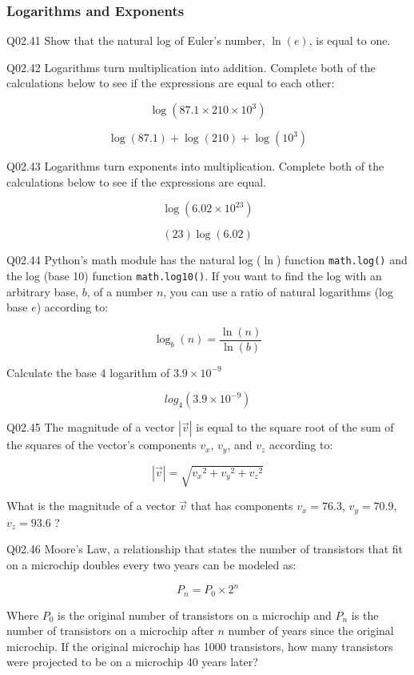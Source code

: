 \documentclass{book}
\newenvironment{problems}{}{}  %
\begin{document}
    




    
        \begin{problems}
        \subsubsection{Logarithms and Exponents}\label{logarithms-and-exponents}

Q02.41 Show that the natural log of Euler's number, \(\ln(e)\), is equal
to one.

Q02.42 Logarithms turn multiplication into addition. Complete both of
the calculations below to see if the expressions are equal to each
other:

\[ \log(87.1 \times 210 \times 10^{3}) \]

\[ \log(87.1) + \log(210) + \log(10^{3}) \]

Q02.43 Logarithms turn exponents into multiplication. Complete both of
the calculations below to see if the expressions are equal.

\[ \log(6.02 \times 10^{23}) \]

\[ (23)\log(6.02) \]

Q02.44 Python's math module has the natural log (\(\ln\)) function
\lstinline!math.log()! and the log (base 10) function
\lstinline!math.log10()!. If you want to find the log with an arbitrary
base, \(b\), of a number \(n\), you can use a ratio of natural
logarithms (log base \(e\)) according to:

\[ \log_b(n) = \frac{\ln(n)}{\ln(b)} \]

Calculate the base 4 logarithm of \(3.9 \times 10^{-9}\)

\[ log_{4}(3.9 \times 10^{-9}) \]

Q02.45 The magnitude of a vector \(|\vec{v}|\) is equal to the square
root of the sum of the squares of the vector's components \(v_x\),
\(v_y\), and \(v_z\) according to:

\[ |\vec{v}| = \sqrt{{v_x}^2 + {v_y}^2 + {v_z}^2} \]

What is the magnitude of a vector \(\vec{v}\) that has components
\(v_x = 76.3\), \(v_y = 70.9\), \(v_z = 93.6\) ?

Q02.46 Moore's Law, a relationship that states the number of transistors
that fit on a microchip doubles every two years can be modeled as:

\[ P_n = P_0 \times 2^n \]

Where \(P_0\) is the original number of transistors on a microchip and
\(P_n\) is the number of transistors on a microchip after \(n\) number
of years since the original microchip. If the original microchip has
1000 transistors, how many transistors were projected to be on a
microchip 40 years later?
        \end{problems}
\end{document}
